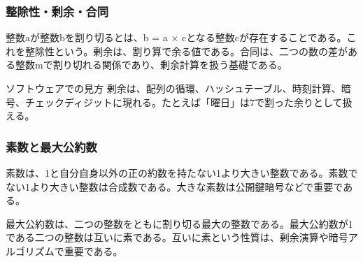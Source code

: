 \subsubsection{整除性・剰余・合同}
整数aが整数bを割り切るとは、b = a × cとなる整数cが存在することである。これを整除性という。剰余は、割り算で余る値である。合同は、二つの数の差がある整数mで割り切れる関係であり、剰余計算を扱う基礎である。

\begin{notebox}{ソフトウェアでの見方}
剰余は、配列の循環、ハッシュテーブル、時刻計算、暗号、チェックディジットに現れる。たとえば「曜日」は7で割った余りとして扱える。
\end{notebox}
\subsubsection{素数と最大公約数}
素数は、1と自分自身以外の正の約数を持たない1より大きい整数である。素数でない1より大きい整数は合成数である。大きな素数は公開鍵暗号などで重要である。

最大公約数は、二つの整数をともに割り切る最大の整数である。最大公約数が1である二つの整数は互いに素である。互いに素という性質は、剰余演算や暗号アルゴリズムで重要である。
